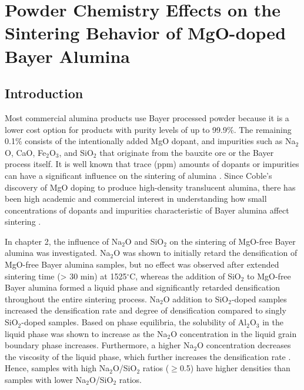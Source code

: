 \chapter{Powder Chemistry Effects on the Sintering Behavior of MgO-doped Bayer Alumina}

\section{Introduction}
Most commercial alumina products use Bayer processed powder because it is a lower cost option for products with purity levels of up to 99.9\%. The remaining 0.1\% consists of the intentionally added MgO dopant, and impurities such as Na$_{2}$O, CaO, Fe$_{2}$O$_{3}$, and SiO$_{2}$ that originate from the bauxite ore or the Bayer process itself. It is well known that trace (ppm) amounts of dopants or impurities can have a significant influence on the sintering of alumina \cite{Bae1994,Bae1997,Bae1993}. Since Coble's discovery of MgO doping to produce high-density translucent alumina, there has been high academic and commercial interest in understanding how small concentrations of dopants and impurities characteristic of Bayer alumina affect sintering \cite{Bennison1990,Jorgensen1965,Heuer1979,Louet2005a,Park2000a}.

In chapter 2, the influence of Na$_{2}$O and SiO$_{2}$ on the sintering of MgO-free Bayer alumina was investigated. Na$_{2}$O was shown to initially retard the densification of MgO-free Bayer alumina samples, but no effect was observed after extended sintering time (> 30 min) at 1525$^{\circ}$C, whereas the addition of SiO$_{2}$ to MgO-free Bayer alumina formed a liquid phase and significantly retarded densification throughout the entire sintering process. Na$_{2}$O addition to SiO$_{2}$-doped samples increased the densification rate and degree of densification compared to singly SiO$_{2}$-doped samples. Based on phase equilibria, the solubility of Al$_{2}$O$_{3}$ in the liquid phase was shown to increase as the Na$_{2}$O concentration in the liquid grain boundary phase increases. Furthermore, a higher Na$_{2}$O concentration decreases the viscosity of the liquid phase, which further increases the densification rate \cite{Frueh2016a}. Hence, samples with high Na$_{2}$O/SiO$_{2}$ ratios ($\geq$0.5) have higher densities than samples with lower Na$_{2}$O/SiO$_{2}$ ratios. 

